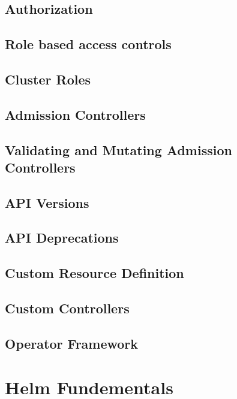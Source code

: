 \documentclass[11pt]{book}
\begin{document}
    \section{Authorization}

    \section{Role based access controls}

    \section{Cluster Roles}

    \section{Admission Controllers}

    \section{Validating and Mutating Admission Controllers}

    \section{API Versions}

    \section{API Deprecations}

    \section{Custom Resource Definition}

    \section{Custom Controllers}

    \section{Operator Framework}

    \chapter{Helm Fundementals}
\end{document}
